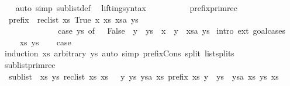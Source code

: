\begin{isabellebody}
%
\isadelimproof
\ \ %
\endisadelimproof
%
\isatagproof
{}\isamarkupfalse%
\ {\isacharparenleft}auto\ simp{\isacharcolon}\ sublist{\isacharunderscore}def{\isacharparenright}%
\endisatagproof
{\isafoldproof}%
%
\isadelimproof
%
\endisadelimproof
%
\isadelimdocument
%
\endisadelimdocument
%
\isatagdocument
%
\isamarkuptrue%
%
\endisatagdocument
{\isafolddocument}%
%
\isadelimdocument
%
\endisadelimdocument
{}\isamarkupfalse%
\ \ lifting{\isacharunderscore}syntax\isanewline
{}\ \ \ \ \isanewline
\ \ \isanewline
{}\ \isamarkupfalse%
\ prefix{\isacharunderscore}primrec{\isacharcolon}\isanewline
\ \ {\isachardoublequoteopen}prefix\ {\isacharequal}\ rec{\isacharunderscore}list\ {\isacharparenleft}{\isasymlambda}xs{\isachardot}\ True{\isacharparenright}\ {\isacharparenleft}{\isasymlambda}x\ xs\ xsa\ ys{\isachardot}\isanewline
\ \ \ \ \ \ \ \ \ \ \ \ \ \ case\ ys\ of\ {\isacharbrackleft}{\isacharbrackright}\ {\isasymRightarrow}\ False\ {\isacharbar}\ y\ {\isacharhash}\ ys\ {\isasymRightarrow}\ x\ {\isacharequal}\ y\ {\isasymand}\ xsa\ ys{\isacharparenright}{\isachardoublequoteclose}\isanewline
%
\isadelimproof
%
\endisadelimproof
%
\isatagproof
{}\isamarkupfalse%
\ {\isacharparenleft}intro\ ext{\isacharcomma}\ goal{\isacharunderscore}cases{\isacharparenright}\isanewline
\ \ \isamarkupfalse%
\ {\isacharparenleft}{}\ xs\ ys{\isacharparenright}\isanewline
\ \ \isamarkupfalse%
\ {\isacharquery}case\ \isamarkupfalse%
\ {\isacharparenleft}induction\ xs\ arbitrary{\isacharcolon}\ ys{\isacharparenright}\ {\isacharparenleft}auto\ simp{\isacharcolon}\ prefix{\isacharunderscore}Cons\ split{\isacharcolon}\ list{\isachardot}splits{\isacharparenright}\isanewline
{}\isamarkupfalse%
\isanewline
\isanewline
{}%
\endisatagproof
{\isafoldproof}%
%
\isadelimproof
%
\endisadelimproof
\ \isamarkupfalse%
\ sublist{\isacharunderscore}primrec{\isacharcolon}\isanewline
\ \ {\isachardoublequoteopen}sublist\ {\isacharequal}\ {\isacharparenleft}{\isasymlambda}xs\ ys{\isachardot}\ rec{\isacharunderscore}list\ {\isacharparenleft}{\isasymlambda}xs{\isachardot}\ xs\ {\isacharequal}\ {\isacharbrackleft}{\isacharbrackright}{\isacharparenright}\ {\isacharparenleft}{\isasymlambda}y\ ys\ ysa\ xs{\isachardot}\ prefix\ xs\ {\isacharparenleft}y\ {\isacharhash}\ ys{\isacharparenright}\ {\isasymor}\ ysa\ xs{\isacharparenright}\ ys\ xs{\isacharparenright}{\isachardoublequoteclose}\isanewline

\end{isabellebody}
